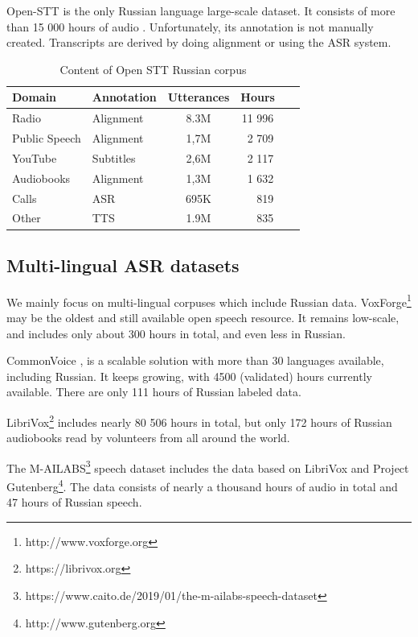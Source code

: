 \documentclass[a4paper]{article}
\begin{document}
Open-STT is the only Russian language large-scale dataset. It consists of more than 15 000 hours of audio \cite{veysov2020towardimagenetstt}. Unfortunately, its annotation is not manually created. Transcripts are derived by doing alignment or using the ASR system. 

\begin{table}[th]
  \caption{Content of Open STT Russian corpus}
  \label{tab:openstt}
  \centering
  \begin{tabular}{ llcr }
    \toprule
    Domain & Annotation & Utterances & Hours~~~  \\
    \midrule
    Radio &     Alignment & 8.3M & 11 996 ~~~  \\
    Public Speech & Alignment  & 1,7M & 2 709 ~~~ \\
    YouTube & Subtitles  & 2,6M & 2 117 ~~~ \\
    Audiobooks & Alignment  & 1,3M & 1 632 ~~~ \\
    Calls & ASR  & 695K & 819 ~~~ \\
    Other & TTS  & 1.9M & 835 ~~~ \\
    \bottomrule
  \end{tabular}
\end{table}

\subsection{Multi-lingual ASR datasets}

We mainly focus on multi-lingual corpuses which include Russian data. VoxForge\footnote{http://www.voxforge.org} may be the oldest and still available open speech resource. It remains low-scale, and includes only about 300 hours in total, and even less in Russian.

CommonVoice \cite{ardila2019common}, is a scalable solution with more than 30 languages available, including Russian. It keeps growing, with 4500 (validated) hours currently available. There are only 111 hours of Russian labeled data.

LibriVox\footnote{https://librivox.org} includes nearly 80 506 hours in total, but only 172 hours of Russian audiobooks read by volunteers from all around the world.

The M-AILABS\footnote{https://www.caito.de/2019/01/the-m-ailabs-speech-dataset} speech dataset includes the data based on LibriVox and Project Gutenberg\footnote{http://www.gutenberg.org}. The data consists of nearly a thousand hours of audio in total and 47 hours of Russian speech.
\end{document}
